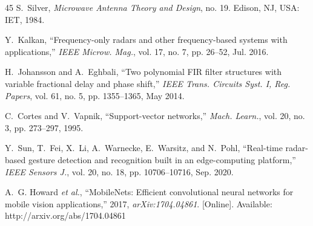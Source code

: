 \begin{TranslationNoMiniToc}
\begin{thebibliography}{45}
S.~Silver, \emph{Microwave Antenna Theory and Design}, no. 19. Edison, NJ, USA: IET, 1984.

Y.~Kalkan, ``Frequency-only radars and other frequency-based systems with applications,'' \emph{IEEE Microw. Mag.}, vol. 17, no. 7, pp. 26--52, Jul. 2016.

H.~Johansson and A.~Eghbali, ``Two polynomial FIR filter structures with variable fractional delay and phase shift,'' \emph{IEEE Trans. Circuits Syst. I, Reg. Papers}, vol. 61, no. 5, pp. 1355--1365, May 2014.

C.~Cortes and V.~Vapnik, ``Support-vector networks,'' \emph{Mach. Learn.}, vol. 20, no. 3, pp. 273--297, 1995.

Y.~Sun, T.~Fei, X.~Li, A.~Warnecke, E.~Warsitz, and N.~Pohl, ``Real-time radar-based gesture detection and recognition built in an edge-computing platform,'' \emph{IEEE Sensors J.}, vol. 20, no. 18, pp. 10706--10716, Sep. 2020.

A.~G. Howard \emph{et al.}, ``MobileNets: Efficient convolutional neural networks for mobile vision applications,'' 2017, \emph{arXiv:1704.04861}. [Online]. Available: http://arxiv.org/abs/1704.04861

\end{thebibliography}
\endgroup

\end{TranslationNoMiniToc}